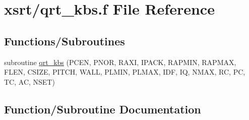 \hypertarget{qrt__kbs_8f}{}\section{xsrt/qrt\+\_\+kbs.f File Reference}
\label{qrt__kbs_8f}
\subsection*{Functions/\+Subroutines}
\begin{DoxyCompactItemize}
\item 
subroutine \hyperlink{qrt__kbs_8f_a4fee889c2f4ebde8bbca0302c6eed2ab}{qrt\+\_\+kbs} (P\+C\+EN, P\+N\+OR, R\+A\+XI, I\+P\+A\+CK, R\+A\+P\+M\+IN, R\+A\+P\+M\+AX, F\+L\+EN, C\+S\+I\+ZE, P\+I\+T\+CH, W\+A\+LL, P\+L\+M\+IN, P\+L\+M\+AX, I\+DF, IQ, N\+M\+AX, RC, PC, TC, AC, N\+S\+ET)
\end{DoxyCompactItemize}


\subsection{Function/\+Subroutine Documentation}
\mbox{\label{qrt__kbs_8f_a4fee889c2f4ebde8bbca0302c6eed2ab}} 
